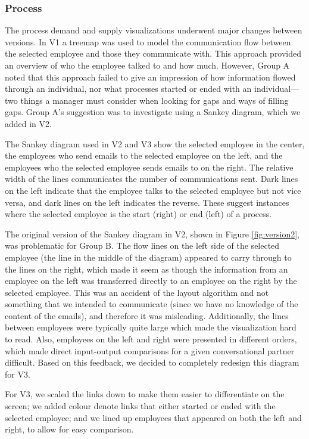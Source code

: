 \documentclass[journal]{vgtc}                %
\begin{document}
\subsubsection{Process}

The process demand and supply visualizations underwent major changes between versions.  In V1 a treemap was used to model the communication flow between the selected employee and those they communicate with.  This approach provided an overview of who the employee talked to and how much. However, Group A noted that this approach failed to give an impression of how information flowed through an individual, nor what processes started or ended with an individual---two things a manager must consider when looking for gaps and ways of filling gaps.  Group A's suggestion was to investigate using a Sankey diagram, which we added in V2.

The Sankey diagram used in V2 and V3 show the selected employee in the center, the employees who send emails to the selected employee on the left, and the employees who the selected employee sends emails to on the right. The relative width of the lines communicates the number of communications sent. Dark lines on the left indicate that the employee talks to the selected employee but not vice versa, and dark lines on the left indicates the reverse. These suggest instances where the selected employee is the start (right) or end (left) of a process. 

The original version of the Sankey diagram in V2, shown in Figure \ref{fig:version2}, was problematic for Group B. The flow lines on the left side of the selected employee (the line in the middle of the diagram) appeared to carry through to the lines on the right, which made it seem as though the information from an employee on the left was transferred directly to an employee on the right by the selected employee. This was an accident of the layout algorithm and not something that we intended to communicate (since we have no knowledge of the content of the emails), and therefore it was misleading. Additionally, the lines between employees were typically quite large which made the visualization hard to read. Also, employees on the left and right were presented in different orders, which made direct input-output comparisons for a given conversational partner difficult. Based on this feedback, we decided to completely redesign this diagram for V3.

For V3, we scaled the links down to make them easier to differentiate on the screen; we added colour denote links that either started or ended with the selected employee; and we lined up employees that appeared on both the left and right, to allow for easy comparison.
\end{document}
